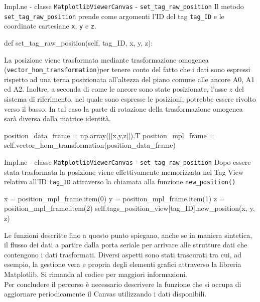 \begin{frame}[fragile, shrink=15]{Impl.ne - classe \lstinline!MatplotlibViewerCanvas! - \lstinline!set_tag_raw_position!}
  Il metodo \lstinline!set_tag_raw_position! prende come argomenti l'ID del tag \lstinline!tag_ID! e le coordinate cartesiane
  \lstinline!x!, \lstinline!y! e \lstinline!z!.

  \begin{Python}
    def set_tag_raw_position(self, tag_ID, x, y, z):
  \end{Python}

  La posizione viene trasformata mediante trasformazione omogenea (\lstinline!vector_hom_transformation!)per tenere conto del fatto
  che i dati sono espressi rispetto ad una terna posizionata all'altezza del piano comune alle
  ancore A0, A1 ed A2. Inoltre, a seconda di come le ancore sono state posizionate, l'asse $z$
  del sistema di riferimento, nel quale sono espresse le posizioni, potrebbe essere rivolto verso il basso.
  In tal caso la parte di rotazione della trasformazione omogenea sarà diversa dalla matrice identità.
  \begin{Python}
        position_data_frame = np.array([[x,y,z]]).T
        position_mpl_frame = self.vector_hom_transformation(position_data_frame)

  \end{Python}
\end{frame}

\begin{frame}[fragile, shrink=10]{Impl.ne - classe \lstinline!MatplotlibViewerCanvas! - \lstinline!set_tag_raw_position!}
  Dopo essere stata trasformata la posizione viene effettivamente memorizzata nel Tag View relativo
  all'ID \lstinline!tag_ID! attraverso la chiamata alla funzione \lstinline!new_position()!
  \begin{Python}
        x = position_mpl_frame.item(0)
        y = position_mpl_frame.item(1)
        z = position_mpl_frame.item(2)
        self.tags_position_view[tag_ID].new_position(x, y, z)
  \end{Python}

  Le funzioni descritte fino a questo punto spiegano, anche se in maniera sintetica,
  il flusso dei dati a partire dalla porta seriale per arrivare alle strutture dati
  che contengono i dati trasformati. Diversi aspetti sono stati trascurati tra cui,
  ad esempio, la gestione vera e propria degli elementi grafici attraverso la libreria
  Matplotlib. Si rimanda al codice per maggiori informazioni.\\
  Per concludere il percorso è necessario descrivere la funzione che si occupa di aggiornare
  periodicamente il Canvas utilizzando i dati disponibili.
\end{frame}

